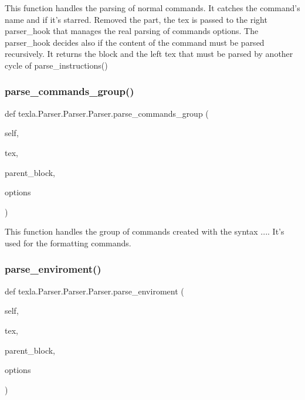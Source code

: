 \begin{DoxyVerb}This function handles the parsing of normal
commands. It catches the command's name and if it's
starred. Removed the \cmd part, the tex is passed
to the right parser_hook that manages the real
parsing of commands options. The parser_hook decides
also if the content of the command must be parsed
recursively.
It returns the block and the left tex that must
be parsed by another cycle of parse_instructions()
\end{DoxyVerb}
 \hypertarget{classtexla_1_1Parser_1_1Parser_1_1Parser_a2ce55a1ea4d024ff77ce3a3718b76bbd}{}\label{classtexla_1_1Parser_1_1Parser_1_1Parser_a2ce55a1ea4d024ff77ce3a3718b76bbd} 
\subsubsection{\texorpdfstring{parse\+\_\+commands\+\_\+group()}{parse\_commands\_group()}}
{\footnotesize\ttfamily def texla.\+Parser.\+Parser.\+Parser.\+parse\+\_\+commands\+\_\+group (\begin{DoxyParamCaption}\item[{}]{self,  }\item[{}]{tex,  }\item[{}]{parent\+\_\+block,  }\item[{}]{options }\end{DoxyParamCaption})}

\begin{DoxyVerb}This function handles the group of commands created
with the syntax {...}. It's used for the formatting
commands.
\end{DoxyVerb}
 \hypertarget{classtexla_1_1Parser_1_1Parser_1_1Parser_ae5a596144e7be79cbca63d05dce99f06}{}\label{classtexla_1_1Parser_1_1Parser_1_1Parser_ae5a596144e7be79cbca63d05dce99f06} 
\subsubsection{\texorpdfstring{parse\+\_\+enviroment()}{parse\_enviroment()}}
{\footnotesize\ttfamily def texla.\+Parser.\+Parser.\+Parser.\+parse\+\_\+enviroment (\begin{DoxyParamCaption}\item[{}]{self,  }\item[{}]{tex,  }\item[{}]{parent\+\_\+block,  }\item[{}]{options }\end{DoxyParamCaption})}

